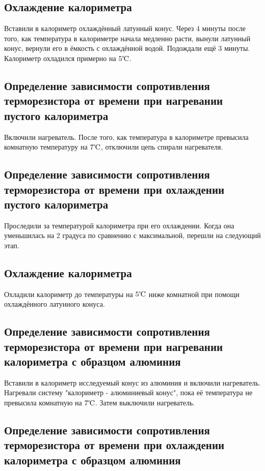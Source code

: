     \subsection*{Охлаждение калориметра}
    
    Вставили в калориметр охлаждённый латунный конус. Через 4 минуты после того, как температура в калориметре начала медленно расти, вынули латунный конус, вернули его в ёмкость с охлаждённой водой. Подождали ещё 3 минуты. Калориметр охладился примерно на $5 \celsius$.

    \subsection*{Определение зависимости сопротивления терморезистора от времени при нагревании пустого калориметра}
    
    Включили нагреватель. После того, как температура в калориметре превысила комнатную температуру на $7 \celsius$, отключили цепь спирали нагревателя.

    \subsection*{Определение зависимости сопротивления терморезистора от времени при охлаждении пустого калориметра}

    Проследили за температурой калориметра при его охлаждении. Когда она уменьшилась на 2 градуса по сравнению с максимальной, перешли на следующий этап.

    \subsection*{Охлаждение калориметра}

    Охладили калориметр до температуры на $5 \celsius$ ниже комнатной при помощи охлаждённого латунного конуса. 
    
    \subsection*{Определение зависимости сопротивления терморезистора от времени при нагревании калориметра с образцом алюминия}
    
    Вставили в калориметр исследуемый конус из алюминия и включили нагреватель. Нагревали систему "калориметр - алюминиевый конус", пока её температура не превысила комнатную на $7 \celsius$. Затем выключили нагреватель.

    \subsection*{Определение зависимости сопротивления терморезистора от времени при охлаждении калориметра с образцом алюминия}

